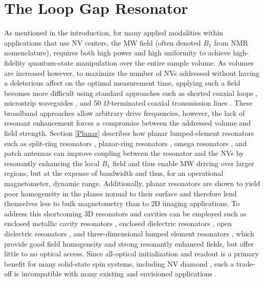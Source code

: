 
\chapter{The Loop Gap Resonator}

As mentioned in the introduction, for many applied modalities within applications that use NV centers, the MW field (often denoted $B_1$ from NMR nomenclature), requires both high power and high uniformity to achieve high-fidelity quantum-state manipulation over the entire sample volume. As volumes are increased however, to maximize the number of NVs addressed without having a deleterious affect on the optimal measurement time, applying such a field becomes more difficult using standard approaches such as shorted coaxial loops \cite{clevenson2015broadband,chipaux2015magnetic}, microstrip waveguides \cite{andrich2017long,horowitz2012electron}, and 50 $\Omega$-terminated coaxial transmission lines \cite{li2010design,mrozek2015circularly,zhang2016microwave,zhang2018vector}. These broadband approaches allow arbitrary drive frequencies, however, the lack of resonant enhancement forces a compromise between the addressed volume and field strength. Section \ref{Planar} describes how planar lumped-element resonators such as split-ring resonators \cite{bayat2014efficient}, planar-ring resonators \cite{zhang2016microwave,sasaki2016broadband}, omega resonators \cite{twig2013ultra,horsley2018microwave,simpson2017electron}, and patch antennas \cite{zhang2016microwave} can improve coupling between the resonator and the NVs by resonantly enhancing the local $B_1$ field and thus enable MW driving over larger regions, but at the expense of bandwidth and thus, for an operational magnetometer, dynamic range. Additionally, planar resonators are shown to yield poor homogeneity in the planes normal to their surface and therefore lend themselves less to bulk magnetometry than to 2D imaging applications. To address this shortcoming 3D resonators and cavities can be employed such as enclosed metallic cavity resonators \cite{rose2017coherent}, enclosed dielectric resonators \cite{breeze2017continuous,floch2016towards,creedon2015strong}, open dielectric resonators \cite{kapitanova2017dielectric}, and three-dimensional lumped element resonators \cite{angerer2016collective}, which provide good field homogeneity and strong resonantly enhanced fields, but offer little to no optical access. Since all-optical initialization and readout is a primary benefit for many solid-state spin systems, including NV diamond \cite{doherty2013nitrogen}, such a trade-off is incompatible with many existing and envisioned applications \cite{schirhagl2014nitrogen}. 

